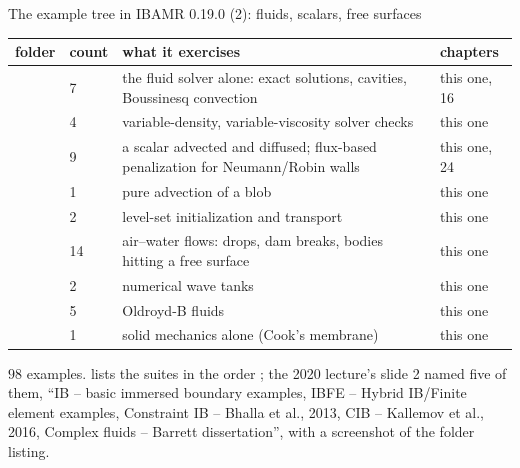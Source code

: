 \documentclass[aspectratio=169,11pt]{beamer}
\begin{document}
\begin{frame}{The example tree in IBAMR 0.19.0 (2): fluids, scalars, free surfaces}
\label{fr:tree2}
\scriptsize
\setlength{\tabcolsep}{3pt}
\begin{tabular}{@{}llL{0.5\textwidth}l@{}}
\toprule
folder & count & what it exercises & chapters\\
\midrule
{} & 7 & the fluid solver alone: exact solutions, cavities, Boussinesq convection & this one, 16\\
 & 4 & variable-density, variable-viscosity solver checks & this one\\
 & 9 & a scalar advected and diffused; flux-based penalization for Neumann/Robin walls & this one, 24\\
 & 1 & pure advection of a blob & this one\\
 & 2 & level-set initialization and transport & this one\\
 & 14 & air--water flows: drops, dam breaks, bodies hitting a free surface & this one\\
 & 2 & numerical wave tanks & this one\\
 & 5 & Oldroyd-B fluids & this one\\
 & 1 & solid mechanics alone (Cook's membrane) & this one\\
\bottomrule
\end{tabular}
\vspace{1mm}

\scriptsize $98$ examples.  lists the suites in the order ; the 2020 lecture's slide 2 named five of them, ``IB -- basic immersed boundary examples, IBFE -- Hybrid IB/Finite element examples, Constraint IB -- Bhalla et al., 2013, CIB -- Kallemov et al., 2016, Complex fluids -- Barrett dissertation'', with a screenshot of the folder listing.
\end{frame}
\end{document}

